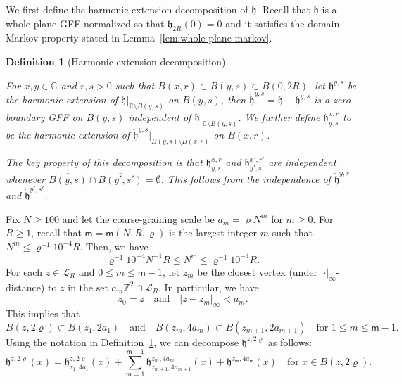 \documentclass[a4paper]{article}
\numberwithin{equation}{section}
\newtheorem{definition}[theorem]{Definition}
\numberwithin{equation}{section}
\renewcommand{\1}{\mathbf{1}}
\begin{document}
We first define the harmonic extension decomposition of $\mathfrak h$. Recall that $\mathfrak h$ is a whole-plane GFF normalized so that $\mathfrak h_{2R}(0) = 0$ and it satisfies the domain Markov property stated in Lemma~\ref{lem:whole-plane-markov}.

\begin{definition}[Harmonic extension decomposition]\label{def:harmonic-extension}

For $x,y \in \mathbb{C}$ and $r,s>0$ such that $B(x,r) \subset B(y,s) \subset B(0, 2R)$, let $\mathfrak h^{y, s}$ be the harmonic extension of $\mathfrak h|_{\mathbb{C} \setminus B(y, s)}$ on $B(y, s)$, then $\mathring{\mathfrak h}^{y, s} = \mathfrak h - \mathfrak h^{y, s}$ is a zero-boundary GFF on $B(y, s)$ independent of $\mathfrak h|_{\mathbb{C} \setminus B(y, s)}$. We further define $\mathfrak h^{x, r}_{y,s}$ to be the harmonic extension of $\mathring{\mathfrak h}^{y, s}|_{B(y,s) \setminus B(x,r)}$ on $B(x, r)$.

The key property of this decomposition is that $\mathfrak h^{x, r}_{y, s}$ and $\mathfrak h^{x', r'}_{y', s'}$ are independent whenever $\overline{B(y,s)} \cap \overline{B(y',s')} = \emptyset$. This follows from the independence of $\mathring{\mathfrak h}^{y, s}$ and $\mathring{\mathfrak h}^{y', s'}$.

\end{definition}

Fix $N \geq 100$ and let the coarse-graining scale be $a_m = \varrho N^m$ for $m \geq 0$. For $R \geq 1$, recall that $\mathsf{m} = \mathsf{m}(N, R, \varrho)$ is the largest integer $m$ such that $N^m \leq \varrho^{-1} 10^{-4} R$. Then, we have 
\begin{equation}\label{eq:bound-N}
    \varrho^{-1} 10^{-4} N^{-1} R \leq N^{\mathsf m} \leq \varrho^{-1} 10^{-4} R.
\end{equation}
For each $z \in \mathscr{L}_R$ and $0 \leq m \leq \mathsf m-1$, let $z_m$ be the closest vertex (under $|\cdot|_\infty$-distance) to $z$ in the set $a_m \mathbb{Z}^2 \cap \mathscr{L}_R$. In particular, we have
\begin{equation}\label{eq:dist-zm}
    z_0 = z \quad \mbox{and} \quad |z - z_m|_\infty < a_m.
\end{equation}
This implies that 
\begin{equation}\label{eq:sec5.2-ball}
B(z,2\varrho) \subset B(z_1, 2a_1) \quad \mbox{and} \quad B(z_m, 4a_m) \subset B(z_{m+1}, 2a_{m+1}) \quad \mbox{for } 1 \leq m \leq \mathsf m-1.
\end{equation}
Using the notation in Definition~\ref{def:harmonic-extension}, we can decompose $\mathfrak h^{z,2\varrho}$ as follows:
\begin{equation}\label{eq:gff-decompose}
\mathfrak h^{z,2\varrho}(x) = \mathfrak h^{z,2\varrho}_{z_1, 4a_1}(x) + \sum_{m=1}^{\mathsf m-1} \mathfrak h^{z_m, 4a_m}_{z_{m+1}, 4a_{m+1}}(x) + \mathfrak h^{z_{\mathsf m}, 4 a_{\mathsf m}}(x) \quad \mbox{for } x \in B(z,2\varrho).
\end{equation}
\end{document}
